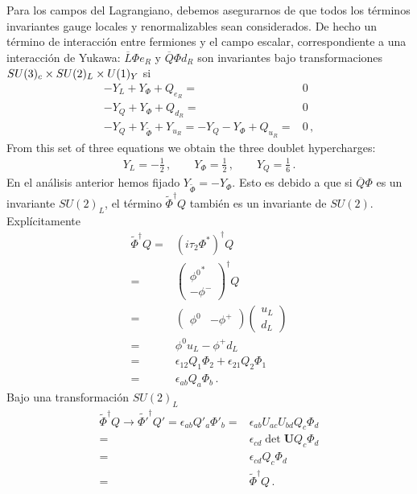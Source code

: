 \begin{frame}
Para los campos del Lagrangiano, debemos asegurarnos de que todos los términos invariantes gauge locales y renormalizables sean considerados. De hecho un término de interacción entre fermiones y el campo escalar, correspondiente a una interacción de Yukawa: $\overline{L}\Phi e_R$ y $\overline{Q}\Phi d_R$ son invariantes bajo transformaciones $SU(3)_c\times  SU(2)_L\times  U(1)_Y$ si
\begin{align*}
  -Y_L+Y_\Phi+Q_{e_R}=&0\\
  -Y_Q+Y_\Phi+Q_{d_R}=&0\\
  -Y_Q+Y_{\widetilde{\Phi}}+Y_{u_R}=-Y_Q-Y_{\Phi}+Q_{u_R}=&0\,,
\end{align*}
From this set of three equations we obtain the three doublet hypercharges:
\begin{align}
\label{eq:lhyp}
Y_L=-\frac{1}{2}\,,\qquad Y_\Phi=\frac{1}{2}\,,\qquad Y_Q=\frac{1}{6}\,.
\end{align}
En el análisis anterior hemos fijado $Y_{\widetilde{\Phi}}=-Y_\Phi$. Esto es debido a que  si
$\overline{Q}\Phi$ es un invariante $SU(2)_L$, el término ${\tilde \Phi}^\dagger Q$ también es un invariante de $SU(2)$. Explícitamente
\begin{align}
  \widetilde{\Phi}^\dagger Q=&(i\tau_2\Phi^*)^\dagger Q\nonumber\\
  =& \begin{pmatrix}
    {\phi^0}^*\\
    -\phi^-    
  \end{pmatrix}^\dagger Q\nonumber\\
  =&\begin{pmatrix}
    \phi^0 & -\phi^+
  \end{pmatrix}\begin{pmatrix}
    u_L\\
    d_L
  \end{pmatrix}\nonumber\\
  =&\phi^0 u_L - \phi^+ d_L\nonumber\\
  =&\epsilon_{12}Q_1\Phi_2+\epsilon_{21}Q_2\Phi_1\nonumber\\
  =&\epsilon_{ab}Q_a \Phi_b\,.
\end{align}
Bajo una transformación $SU(2)_L$
\begin{align}
\widetilde{\Phi}^\dagger Q\to {\widetilde{\Phi'}}^\dagger Q'=\epsilon_{ab}Q'_a \Phi'_b=&\epsilon_{ab}U_{ac}U_{bd}Q_c \Phi_d\nonumber\\
  =&\epsilon_{cd}\det\mathbf{U} Q_c \Phi_d\nonumber\\
  =&\epsilon_{cd} Q_c \Phi_d\nonumber\\
  =&\widetilde{\Phi}^\dagger Q\,.
\end{align}


\end{frame}
